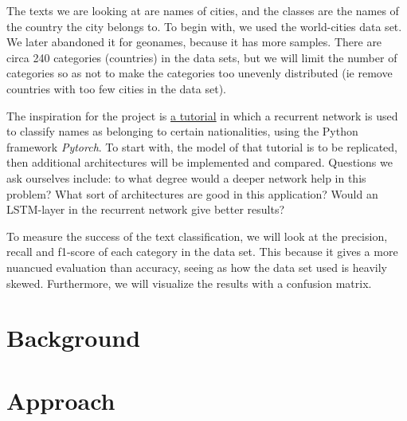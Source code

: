 \documentclass[runningheads]{llncs}
\begin{document}
The texts we are looking at are names of cities, and the classes are the names of the country the city belongs to. To begin with, we used the world-cities data set. We later abandoned it for geonames, because it has more samples. There are circa 240 categories (countries) in the data sets, but we will limit the number of categories so as not to make the categories too unevenly distributed (ie remove countries with too few cities in the data set).

The inspiration for the project is \href{https://github.com/spro/practical-pytorch/blob/master/char-rnn-classification/char-rnn-classification.ipynb}{a tutorial}
 in which a recurrent network is used to classify names as belonging to certain nationalities, using the Python framework \textit{Pytorch}. To start with, the model of that tutorial is to be replicated, then additional architectures will be implemented and compared. Questions we ask ourselves include: to what degree would a deeper network help in this problem? What sort of architectures are good in this application? Would an LSTM-layer in the recurrent network give better results? 

To measure the success of the text classification, we will look at the precision, recall and f1-score of each category in the data set. This because it gives a more nuancued evaluation than accuracy, seeing as how the data set used is heavily skewed. Furthermore, we will visualize the results with a confusion matrix.


\section{Background}



\section{Approach}
\end{document}
